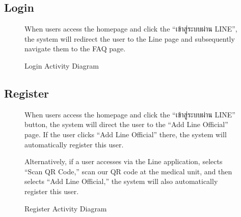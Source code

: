 \documentclass[12pt,oneside,openright,a4paper]{cpe-english-project}
\begin{document}
      \subsection{Login}
      \begin{figure}[!h]
        \centering
        \caption{Login Activity Diagram}\label{fig:AD_Login}
        \begin{flushleft}
          \qquad When users access the homepage and click the “\textthai{เข้าสู่ระบบผ่าน} LINE”, the system will redirect the user to the Line page and subsequently navigate them to the FAQ page. \par
        \end{flushleft}
      \end{figure}
\newpage
      \subsection{Register}
      \begin{figure}[!h]
        \centering
        \caption{Register Activity Diagram}\label{fig:AD_Register}
        \begin{flushleft}
          \qquad When users access the homepage and click the “\textthai{เข้าสู่ระบบผ่าน} LINE” button, the system will direct the user to the “Add Line Official” page. If the user clicks “Add Line Official” there, the system will automatically register this user.  \par
          \qquad Alternatively, if a user accesses via the Line application, selects “Scan QR Code,” scan our QR code at the medical unit, and then selects “Add Line Official,” the system will also automatically register this user.  \par
        \end{flushleft}
      \end{figure}
\end{document}
